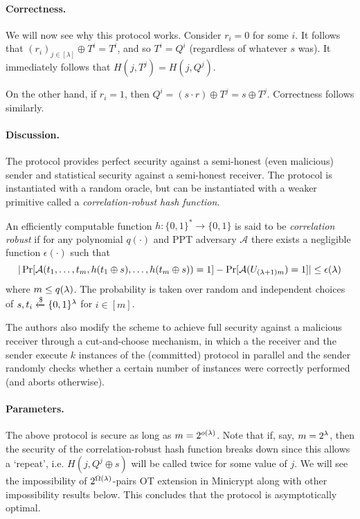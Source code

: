 \paragraph{Correctness.} We will now see why this protocol works. Consider $r_i = 0$ for some $i$. It follows that $(r_i)_{j\in[\lambda]}\oplus T^i = T^i$, and so $T^i=Q^i$ (regardless of whatever $s$ was). It immediately follows that $H(j, T^j) = H(j, Q^j)$.

On the other hand, if $r_i = 1$, then $Q^i = (s \cdot r)\oplus T^j =s\oplus  T^j$. Correctness follows similarly.

\paragraph{Discussion.} The protocol provides perfect security against a semi-honest (even malicious) sender and statistical security against a semi-honest receiver. The protocol is instantiated with a random oracle, but can be instantiated with a weaker primitive called a \textit{correlation-robust hash function}.

\begin{definition}
	An \rarrow efficiently computable function $h:\{0,1\}^{*}\rightarrow \{0,1\}$ is said to be \textit{correlation robust} if for any polynomial $q(\cdot)$ and PPT adversary $\mathcal{A}$ there exists a negligible function $\epsilon(\cdot)$ such that
	$$|\Pr[\mathcal{A}(t_1,\dots,t_m, h(t_1\oplus s), \dots, h(t_m\oplus s))=1]-\Pr[\mathcal{A}(U_{(\lambda+1)m})=1]|\leq\epsilon(\lambda)$$
	where $m\leq q(\lambda)$. The probability is taken over random and independent choices of $s, t_i\xleftarrow{\$}\{0,1\}^\lambda$ for $i\in[m]$.
\end{definition}

The authors also modify the scheme to achieve full security against a malicious receiver through a cut-and-choose mechanism, in which a the receiver and the sender execute $k$ instances of the (committed) protocol in parallel and the sender randomly checks whether a certain number of instances were correctly performed (and aborts otherwise).

\paragraph{Parameters.} The above protocol is secure as long as $m=2^{o(\lambda)}$. Note that if, say, $m = 2^\lambda$, then the security of the correlation-robust hash function breaks down since this allows a `repeat', i.e. $H(j, Q^j\oplus s)$ will be called twice for some value of $j$. We will see the impossibility of $2^{\Omega(\lambda)}$-pairs OT extension in Minicrypt along with other impossibility results below. This concludes that the protocol is asymptotically optimal.


